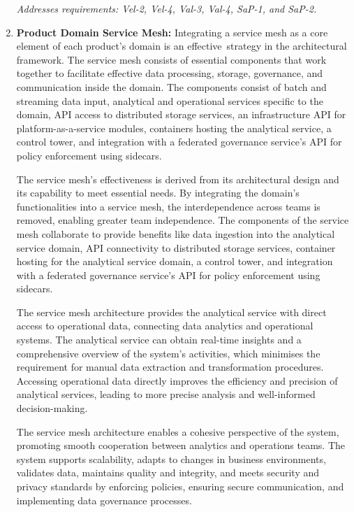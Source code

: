 \documentclass[preprint,12pt]{elsarticle}
\begin{document}
\begin{enumerate}
    \textit{Addresses requirements: Vel-2, Vel-4, Val-3, Val-4, SaP-1, and SaP-2.} 
    
    \item \textbf{Product Domain Service Mesh:} Integrating a service mesh as a core element of each product's domain is an effective strategy in the architectural framework. The service mesh consists of essential components that work together to facilitate effective data processing, storage, governance, and communication inside the domain. The components consist of batch and streaming data input, analytical and operational services specific to the domain, API access to distributed storage services, an infrastructure API for platform-as-a-service modules, containers hosting the analytical service, a control tower, and integration with a federated governance service's API for policy enforcement using sidecars.

    The service mesh's effectiveness is derived from its architectural design and its capability to meet essential needs. By integrating the domain's functionalities into a service mesh, the interdependence across teams is removed, enabling greater team independence. The components of the service mesh collaborate to provide benefits like data ingestion into the analytical service domain, API connectivity to distributed storage services, container hosting for the analytical service domain, a control tower, and integration with a federated governance service's API for policy enforcement using sidecars.
    
    The service mesh architecture provides the analytical service with direct access to operational data, connecting data analytics and operational systems. The analytical service can obtain real-time insights and a comprehensive overview of the system's activities, which minimises the requirement for manual data extraction and transformation procedures. Accessing operational data directly improves the efficiency and precision of analytical services, leading to more precise analysis and well-informed decision-making.
    
    The service mesh architecture enables a cohesive perspective of the system, promoting smooth cooperation between analytics and operations teams. The system supports scalability, adapts to changes in business environments, validates data, maintains quality and integrity, and meets security and privacy standards by enforcing policies, ensuring secure communication, and implementing data governance processes.


\end{enumerate}
\end{document}
